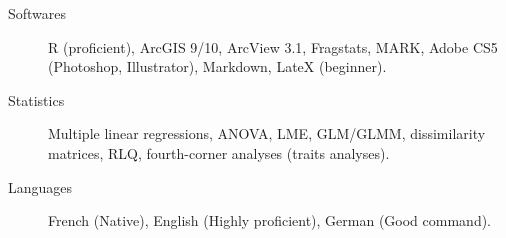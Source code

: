 

\begin{cvparagraph}

 \vspace{.5\baselineskip} 
\begin{description}
\item[Softwares] R (proficient), ArcGIS 9/10, ArcView 3.1, Fragstats, MARK, Adobe CS5 (Photoshop, Illustrator), Markdown, LateX (beginner).
\item[Statistics] Multiple linear regressions, ANOVA, LME, GLM/GLMM, dissimilarity matrices, RLQ, fourth-corner analyses (traits analyses).
\item[Languages] French (Native), English (Highly proficient), German (Good command).
\end{description}
\end{cvparagraph}